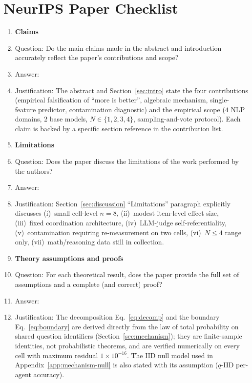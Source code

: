 \section*{NeurIPS Paper Checklist}

\begin{enumerate}

\item {\bf Claims}
    \item[] Question: Do the main claims made in the abstract and introduction accurately reflect the paper's contributions and scope?
    \item[] Answer: \answerYes{}
    \item[] Justification: The abstract and Section~\ref{sec:intro} state the four contributions (empirical falsification of ``more is better'', algebraic mechanism, single-feature predictor, contamination diagnostic) and the empirical scope ($4$ NLP domains, $2$ base models, $N{\in}\{1,2,3,4\}$, sampling-and-vote protocol). Each claim is backed by a specific section reference in the contribution list.

\item {\bf Limitations}
    \item[] Question: Does the paper discuss the limitations of the work performed by the authors?
    \item[] Answer: \answerYes{}
    \item[] Justification: Section~\ref{sec:discussion} ``Limitations'' paragraph explicitly discusses (i)~small cell-level $n{=}8$, (ii)~modest item-level effect size, (iii)~fixed coordination architecture, (iv)~LLM-judge self-referentiality, (v)~contamination requiring re-measurement on two cells, (vi)~$N{\leq}4$ range only, (vii)~math/reasoning data still in collection.

\item {\bf Theory assumptions and proofs}
    \item[] Question: For each theoretical result, does the paper provide the full set of assumptions and a complete (and correct) proof?
    \item[] Answer: \answerYes{}
    \item[] Justification: The decomposition Eq.~\eqref{eq:decomp} and the boundary Eq.~\eqref{eq:boundary} are derived directly from the law of total probability on shared question identifiers (Section~\ref{sec:mechanism}); they are finite-sample identities, not probabilistic theorems, and are verified numerically on every cell with maximum residual $1{\times}10^{-16}$. The IID null model used in Appendix~\ref{app:mechanism-null} is also stated with its assumption ($q$-IID per-agent accuracy).


\end{enumerate}
